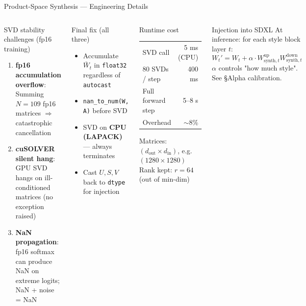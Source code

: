 \documentclass[aspectratio=169,10pt]{beamer}
\begin{document}
\begin{frame}[shrink=15]{Product-Space Synthesis --- Engineering Details}
  \begin{columns}[T]
      \begin{block}{SVD stability challenges (fp16 training)}
        \begin{enumerate}
          \item \textbf{fp16 accumulation overflow}: Summing $N=109$ fp16 matrices $\Rightarrow$ catastrophic cancellation
          \item \textbf{cuSOLVER silent hang}: GPU SVD hangs on ill-conditioned matrices (no exception raised)
          \item \textbf{NaN propagation}: fp16 softmax can produce NaN on extreme logits; NaN + noise = NaN
        \end{enumerate}
      \end{block}
      \begin{exampleblock}{Final fix (all three)}
        \footnotesize
        \begin{itemize}
          \item Accumulate $\bar{W}_t$ in \texttt{float32} regardless of \texttt{autocast}
          \item \texttt{nan\_to\_num(W, A)} before SVD
          \item SVD on \textbf{CPU (LAPACK)} — always terminates
          \item Cast $U,S,V$ back to \texttt{dtype} for injection
        \end{itemize}
      \end{exampleblock}

      \begin{block}{Runtime cost}
        \begin{center}
        \begin{tabular}{lr}
          \toprule
          SVD call & ~5 ms (CPU) \\
          80 SVDs / step & ~400 ms \\
          Full forward step & ~5–8 s \\
          \midrule
          Overhead & $\sim$8\% \\
          \bottomrule
        \end{tabular}
        \end{center}
        \vspace{0.3em}
        \footnotesize Matrices: $(d_\text{out} \times d_\text{in})$, e.g.\ $(1280\times 1280)$\\
        Rank kept: $r=64$ (out of min-dim)
      \end{block}
      \vspace{0.3em}
      \begin{alertblock}{Injection into SDXL}
        \footnotesize
        At inference: for each style block layer $t$:
        \[
          W_t' = W_t + \alpha \cdot W^\text{up}_{\text{synth},t} W^\text{down}_{\text{synth},t}
        \]
        $\alpha$ controls "how much style". See §Alpha calibration.
      \end{alertblock}
  \end{columns}
\end{frame}
\end{document}
